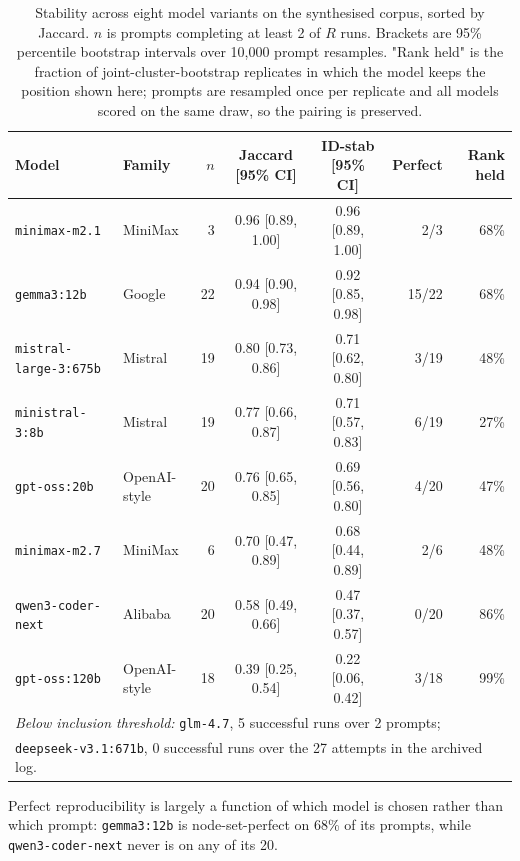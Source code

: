 \documentclass{article}
\begin{document}
\begin{table}[t]
\caption{Stability across eight model variants on the synthesised corpus, sorted by Jaccard. $n$ is prompts completing at least 2 of $R$ runs. Brackets are 95\% percentile bootstrap intervals over 10{,}000 prompt resamples. "Rank held" is the fraction of joint-cluster-bootstrap replicates in which the model keeps the position shown here; prompts are resampled once per replicate and all models scored on the same draw, so the pairing is preserved.}
\label{tab:rq1}
\centering
\small
\setlength{\tabcolsep}{4pt}
\begin{tabular}{llrccrr}
\toprule
Model & Family & $n$ & Jaccard [95\% CI] & ID-stab [95\% CI] & Perfect & Rank held \\
\midrule
\texttt{minimax-m2.1}    & MiniMax      &  3 & 0.96 [0.89, 1.00] & 0.96 [0.89, 1.00] &  2/3  & 68\% \\
\texttt{gemma3:12b}      & Google       & 22 & 0.94 [0.90, 0.98] & 0.92 [0.85, 0.98] & 15/22 & 68\% \\
\texttt{mistral-large-3:675b} & Mistral & 19 & 0.80 [0.73, 0.86] & 0.71 [0.62, 0.80] &  3/19 & 48\% \\
\texttt{ministral-3:8b}  & Mistral      & 19 & 0.77 [0.66, 0.87] & 0.71 [0.57, 0.83] &  6/19 & 27\% \\
\texttt{gpt-oss:20b}     & OpenAI-style & 20 & 0.76 [0.65, 0.85] & 0.69 [0.56, 0.80] &  4/20 & 47\% \\
\texttt{minimax-m2.7}    & MiniMax      &  6 & 0.70 [0.47, 0.89] & 0.68 [0.44, 0.89] &  2/6  & 48\% \\
\texttt{qwen3-coder-next} & Alibaba     & 20 & 0.58 [0.49, 0.66] & 0.47 [0.37, 0.57] &  0/20 & 86\% \\
\texttt{gpt-oss:120b}    & OpenAI-style & 18 & 0.39 [0.25, 0.54] & 0.22 [0.06, 0.42] &  3/18 & 99\% \\
\midrule
\multicolumn{7}{l}{\textit{Below inclusion threshold:} \texttt{glm-4.7}, 5 successful runs over 2 prompts;} \\
\multicolumn{7}{l}{\texttt{deepseek-v3.1:671b}, 0 successful runs over the 27 attempts in the archived log.} \\
\bottomrule
\end{tabular}
\end{table}

Perfect reproducibility is largely a function of which model is chosen rather than which prompt: \texttt{gemma3:12b} is node-set-perfect on 68\% of its prompts, while \texttt{qwen3-coder-next} never is on any of its 20.
\end{document}
